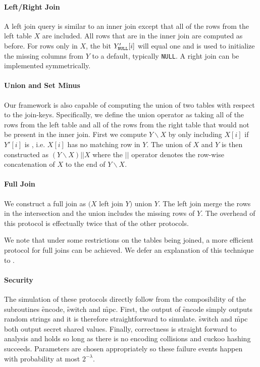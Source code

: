 \paragraph{Left/Right Join}

A left join query is similar to an inner join except that all of the rows from the left table $X$ are included. All rows that are in the inner join are computed as before. For rows only in $X$, the bit $Y_\texttt{NULL}'[i]$ will equal one and is used to initialize the missing columns from $Y$ to a default, typically \texttt{NULL}. A right join can be implemented symmetrically.

\paragraph{Union and Set Minus}

Our framework is also capable of computing the union of two tables with respect to the join-keys. Specifically, we define the union operator as taking all of the rows from the left table and all of the rows from the right table that would not be present in the inner join. First we compute $Y\backslash X$ by only including $X[i]$ if $Y'[i]$ is \Null, i.e. $X[i]$ has no matching row in $Y$. The union of $X$ and $Y$ is then constructed as $(Y\backslash X) || X$ where the $||$ operator denotes the row-wise concatenation of $X$ to the end of $Y\backslash X$.


\paragraph{Full Join}

We construct a full join as $(X$ left join $Y)$ union $Y$. The left join merge the rows in the intersection and the union includes the missing rows of $Y$. The overhead of this protocol is effectually twice that of the other protocols. 

We note that under some restrictions on the tables being joined, a more efficient protocol for full joins can be achieved. We defer an explanation of this technique to .

\paragraph{Security} The simulation of these protocols directly follow from the composibility of the subroutines \f{encode}, \f{switch} and \f{mpc}. First, the output of \f{encode} simply outputs random strings and it is therefore straightforward to simulate.  \f{switch} and \f{mpc} both output secret shared values. Finally, correctness is straight forward to analysis and holds so long as there is no encoding collisions and cuckoo hashing succeeds. Parameters are chosen appropriately so these failure events happen with probability at most $2^{-\lambda}$.

